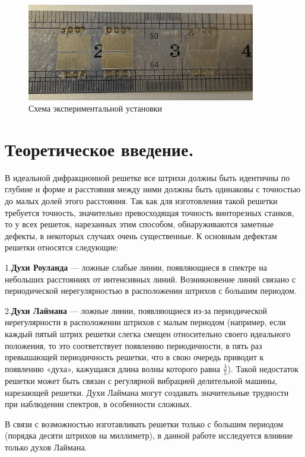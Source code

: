 \documentclass[a4paper,12pt]{article}
\begin{document}
  
    \begin{figure}[H]
  \begin{center}
    \includegraphics[width=10cm]{ex1.jpg}
    \caption{Схема экспериментальной установки}
    \label{fig:}
  \end{center}
\end{figure}



\section{Теоретическое введение.} 
  
  В идеальной дифракционной решетке все штрихи должны быть идентичны по глубине и форме и расстояния между ними должны быть одинаковы с точностью до малых долей этого расстояния. Так как для изготовления такой решетки требуется точность, значительно превосходящая
точность винторезных станков, то у всех решеток, нарезанных этим способом, обнаруживаются заметные дефекты, в некоторых случаях очень
существенные. К основным дефектам решетки относятся следующие:


1.\textbf{Духи Роуланда} — ложные слабые линии, появляющиеся в спектре
на небольших расстояниях от интенсивных линий. Возникновение линий
связано с периодической нерегулярностью в расположении штрихов
с большим периодом.


2.\textbf{Духи Лаймана} — ложные линии, появляющиеся из-за периодической нерегулярности в расположении штрихов с малым периодом (например, если каждый пятый штрих решетки слегка смещен относительно своего идеального положения, то это соответствует появлению
периодичности, в пять раз превышающей периодичность решетки, что
в свою очередь приводит к появлению «духа», кажущаяся длина волны
которого равна  $\frac{\lambda}{5}$). Такой недостаток решетки может быть связан с регулярной вибрацией делительной машины, нарезающей решетки. Духи Лаймана могут создавать значительные трудности при наблюдении спектров, в особенности сложных.
  


В связи с возможностью изготавливать решетки только с большим периодом (порядка десяти штрихов на миллиметр), в данной работе исследуется влияние только духов Лаймана. 
\end{document}
